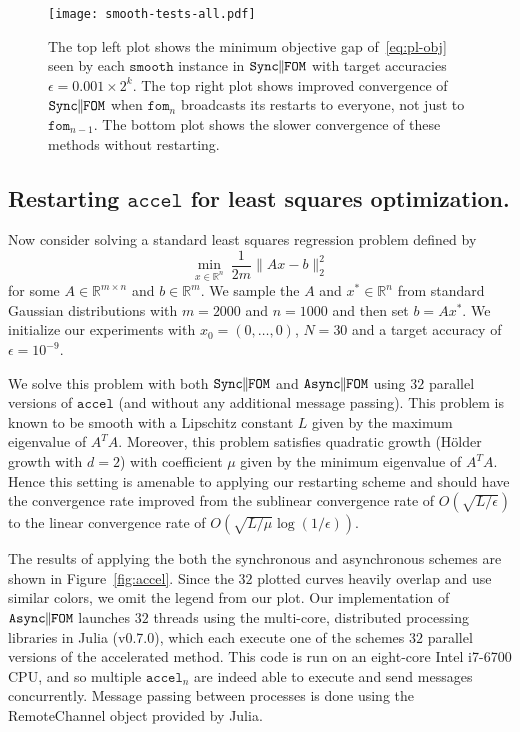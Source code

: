 \documentclass[reqno, 11pt]{amsart}
\numberwithin{equation}{section}
\newcommand{\nt}{\negthinspace}
\newcommand{\fom}{\mathtt{fom}}
\newcommand{\parfom}{\parallel \nt \nt  \mathtt{FOM}}
\newcommand{\accel}{\mathtt{accel}}
\newcommand{\sparfom}{\mathtt{Sync} \nt \nt  \parfom}
\newcommand{\aparfom}{\mathtt{Async} \nt \nt \parfom}
\begin{document}
\begin{figure}
	\centering
	\texttt{[image: smooth-tests-all.pdf]}
	
	\caption{The top left plot shows the minimum objective gap of~\eqref{eq:pl-obj} seen by each $\mathtt{smooth}$ instance in $\sparfom$ with target accuracies $\epsilon=0.001\times 2^k$. The top right plot shows improved convergence of $\sparfom$ when $ \fom_n $ broadcasts its restarts to everyone, not just to $ \fom_{n-1} $.  The bottom plot shows the slower convergence of these methods without restarting.} \label{fig:smooth}
\end{figure}


\subsection{Restarting $\mathtt{accel}$ for least squares optimization.}
Now consider solving a standard least squares regression problem defined by
\begin{equation}\label{eq:regress}
\min_{x\in\mathbb{R}^n}\ \frac{1}{2m}\|Ax-b\|^2_2
\end{equation}
for some $A\in\mathbb{R}^{m\times n}$ and $b\in\mathbb{R}^m$.
We sample the $A$ and $x^*\in\mathbb{R}^n$ from standard Gaussian distributions with $m=2000$ and $n=1000$ and then set $b = Ax^*$. We initialize our experiments with $x_0=(0,\dots,0)$, $N=30$ and a target accuracy of $\epsilon=10^{-9}$.

We solve this problem with both $\sparfom$ and $\aparfom$ using $32$ parallel versions of $\mathtt{accel}$ (and without any additional message passing). This problem is known to be smooth with a Lipschitz constant $L$ given by the maximum eigenvalue of $A^TA$. Moreover, this problem satisfies quadratic growth (H\"older growth with $d=2$) with coefficient $\mu$ given by the minimum eigenvalue of $A^TA$. Hence this setting is amenable to applying our restarting scheme and should have the convergence rate improved from the sublinear convergence rate of $O(\sqrt{L/\epsilon})$ to the linear convergence rate of $O(\sqrt{L/\mu}\log(1/\epsilon))$.

The results of applying the both the synchronous and asynchronous schemes are shown in Figure~\ref{fig:accel}. Since the $32$ plotted curves heavily overlap and use similar colors, we omit the legend from our plot.
Our implementation of $\aparfom$ launches $32$ threads using the multi-core, distributed processing libraries in Julia (v0.7.0), which each execute one of the schemes $32$ parallel versions of the accelerated method. This code is run on an eight-core Intel i7-6700 CPU, and so multiple $\accel_n$ are indeed able to execute and send messages concurrently. Message passing between processes is done using the RemoteChannel object provided by Julia.
\end{document}
